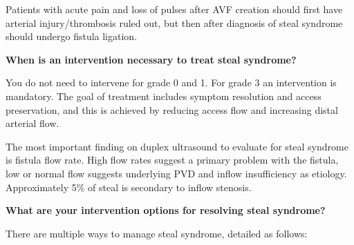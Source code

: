 \documentclass[
]{book}
\begin{document}
Patients with acute pain and loss of pulses after AVF creation should
first have arterial injury/thrombosis ruled out, but then after
diagnosis of steal syndrome should undergo fistula
ligation.\citep{schanzer2004, yevzlin2016}

\textbf{When is an intervention necessary to treat steal syndrome?}

You do not need to intervene for grade 0 and 1.\citep{leake2015} For grade 3
an intervention is mandatory. The goal of treatment includes symptom
resolution and access preservation, and this is achieved by reducing
access flow and increasing distal arterial flow.

The most important finding on duplex ultrasound to evaluate for steal
syndrome is fistula flow rate. High flow rates suggest a primary problem
with the fistula, low or normal flow suggests underlying PVD and inflow
insufficiency as etiology.\citep{alshakarchi2016, leake2015} Approximately
5\% of steal is secondary to inflow stenosis.

\textbf{What are your intervention options for resolving steal syndrome?}

There are multiple ways to manage steal syndrome, detailed as
follows:\citep{leake2015, gupta2011}
\end{document}
